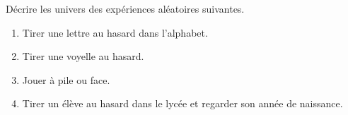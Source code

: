 
\begin{exercice}\label{exosmath-0197}

    Décrire les univers des expériences aléatoires suivantes.
    \begin{enumerate}
        \item
            Tirer une lettre au hasard dans l'alphabet.
        \item
            Tirer une voyelle au hasard.
        \item
            Jouer à pile ou face.
        \item
            Tirer un élève au hasard dans le lycée et regarder son année de naissance.
    \end{enumerate}

\end{exercice}
